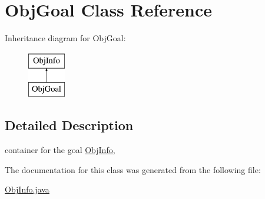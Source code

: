 \hypertarget{classObjGoal}{
\section{ObjGoal Class Reference}
\label{classObjGoal}
}
Inheritance diagram for ObjGoal:\begin{figure}[H]
\begin{center}
\leavevmode
\includegraphics[height=2.000000cm]{classObjGoal}
\end{center}
\end{figure}


\subsection{Detailed Description}
container for the goal \hyperlink{classObjInfo}{ObjInfo}, 

The documentation for this class was generated from the following file:\begin{DoxyCompactItemize}
\item 
\hyperlink{ObjInfo_8java}{ObjInfo.java}\end{DoxyCompactItemize}
